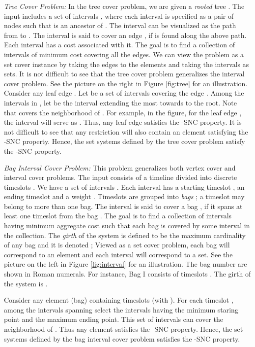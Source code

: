 \documentclass[11pt]{article}
\begin{document}
{\em Tree Cover Problem: }
In the tree cover problem, we are given a {\em rooted} tree .
The input includes a set of intervals , where each interval is specified as a pair of nodes 
such that  is an ancestor of . The interval  can be visualized as the path from  to .
The interval is said to cover an edge , if  is found along the above path.
Each interval  has a cost  associated with it.
The goal is to find a collection of intervals of minimum cost covering all the edges.
We can view the problem as a set cover instance by taking the edges to the elements
and taking the intervals as sets.
It is not difficult to see that the tree cover problem generalizes the interval cover problem. 
See the picture on the right in Figure \ref{fig:tree} for an illustration.
Consider any leaf edge . Let  be a set of intervals covering the edge .
Among the intervals in , let  be the interval extending the most
towards to the root. Note that  covers the neighborhood of .
For example, in the figure, for the leaf edge , the interval  will serve as .
Thus, any leaf edge satisfies the -SNC property.
It is not difficult to see that any restriction will also contain an element satisfying the -SNC property. 
Hence, the set systems defined by the tree cover problem satisfy the -SNC property.

{\em Bag Interval Cover Problem: }
This problem generalizes both vertex cover and interval cover problems.
The input consists of a timeline divided into discrete timeslots .
We have a set of  intervals . 
Each interval  has a starting timeslot , an ending timeslot  and a weight . 
Timeslots are grouped into  {\em bags} ; a timeslot may belong to more than one bag.
The interval  is said to cover a bag , if it spans at least one timeslot from the bag .
The goal is to find a collection of intervals having minimum aggregate cost such that
each bag is covered by some interval in the collection. 
The {\em girth} of the system is defined to be the maximum cardinality of any bag and it is denoted ; 
Viewed as a set cover problem, each bag will correspond to an element and 
each interval will correspond to a set. 
See the picture on the left in Figure \ref{fig:interval} for an illustration. The bag number are shown in Roman numerals.
For instance, Bag I consists of timeslots . The girth of the system is .

Consider any element (bag)  containing timeslots  (with ).
For each timeslot , among the intervals spanning  select the intervals
having the minimum staring point and the maximum ending point.
This set of  intervals can cover the neighborhood of .
Thus any element satisfies the -SNC property.
Hence, the set systems defined by the bag interval cover problem satisfies the -SNC property.
\end{document}
